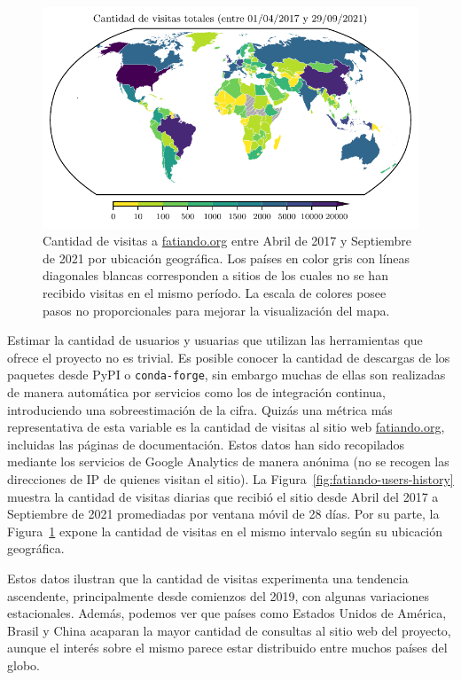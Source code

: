 \begin{figure}[t]
    \centering
    \includegraphics[width=\linewidth]{figs/fatiando/users_map.pdf}
    \caption{
        Cantidad de visitas a \href{https://fatiando.org}{fatiando.org} entre
        Abril de 2017 y Septiembre de 2021 por ubicación geográfica.
        Los países en color gris con líneas diagonales blancas corresponden
        a sitios de los cuales no se han recibido visitas en el mismo período.
        La escala de colores posee pasos no proporcionales para mejorar la
        visualización del mapa.
    }
    \label{fig:fatiando-users-map}
\end{figure}

Estimar la cantidad de usuarios y usuarias que utilizan las herramientas que
ofrece el proyecto no es trivial.
Es posible conocer la cantidad de descargas de los paquetes desde PyPI
o \texttt{conda-forge}, sin embargo muchas de ellas son realizadas de manera
automática por servicios como los de integración continua, introduciendo una
sobreestimación de la cifra.
Quizás una métrica más representativa de esta variable es la cantidad de
visitas al sitio web \href{https://fatiando.org}{fatiando.org}, incluidas las
páginas de documentación.
Estos datos han sido recopilados mediante los servicios de Google Analytics de
manera anónima (no se recogen las direcciones de IP de quienes visitan el
sitio).
La Figura~\ref{fig:fatiando-users-history} muestra la cantidad de visitas
diarias que recibió el sitio desde Abril del 2017 a Septiembre de 2021
promediadas por ventana móvil de
28 días.
Por su parte, la Figura~\ref{fig:fatiando-users-map} expone la cantidad de
visitas en el mismo intervalo según su ubicación geográfica.

Estos datos ilustran que la cantidad de visitas experimenta una tendencia
ascendente, principalmente desde comienzos del 2019, con algunas variaciones
estacionales.
Además, podemos ver que países como Estados Unidos de América, Brasil y China
acaparan la mayor cantidad de consultas al sitio web del proyecto,
aunque el interés sobre el mismo parece estar distribuido entre muchos
países del globo.


